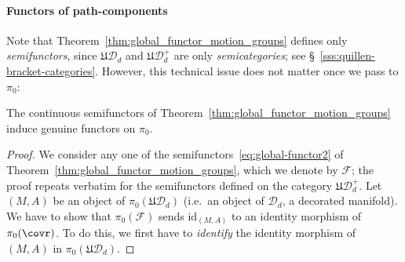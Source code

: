 \documentclass[AHL,Unicode,published]{cedram}
\newcommand{\id}{\mathrm{id}}
\newcommand{\fU}{\ensuremath{\mathfrak{U}}}
\newcommand{\cD}{\mathcal{D}}
\newcommand{\cF}{\mathcal{F}}
\begin{document}
\paragraph*{Functors of path-components}
Note that Theorem~\ref{thm:global_functor_motion_groups} defines only \emph{semifunctors}, since $\fU\cD_{d}$ and $\fU\cD_{d}^{+}$ are only \emph{semicategories}; see \S~\ref{sss:quillen-bracket-categories}. However, this technical issue does not matter once we pass to $\pi_{0}$:

\begin{prop}\label{prop:functor-on-pi0}
The continuous semifunctors of Theorem~\ref{thm:global_functor_motion_groups} induce genuine functors on $\pi_{0}$.
\end{prop}


\begin{proof}
We consider any one of the semifunctors~\eqref{eq:global-functor2} of Theorem~\ref{thm:global_functor_motion_groups}, which we denote by $\cF$; the proof repeats verbatim for the semifunctors defined on the category $\fU\cD_{d}^{+}$. Let $(M,A)$ be an object of $\pi_{0}(\fU\cD_{d})$ (i.e.~an object of $\cD_{d}$, a decorated manifold). We have to show that $\pi_{0}(\cF)$ sends $\id_{(M,A)}$ to an identity morphism of $\pi_{0}(\covr)$. To do this, we first have to \emph{identify} the identity morphism of $(M,A)$ in $\pi_{0}(\fU\cD_{d})$.


\end{proof}
\end{document}
